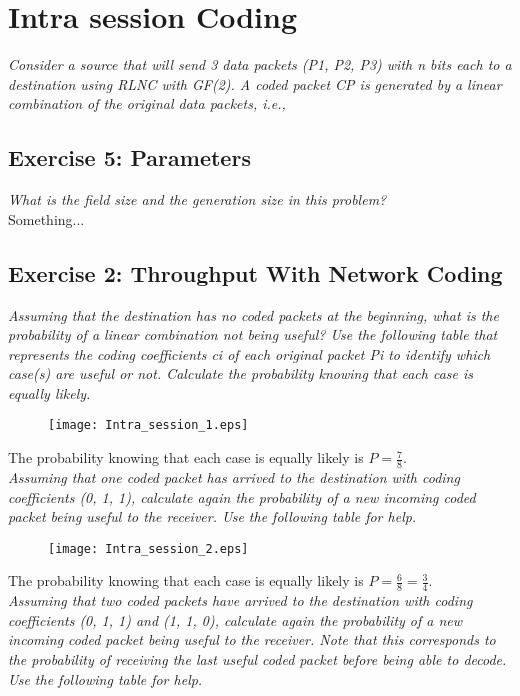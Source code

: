 \section{Intra session Coding}
\textit{Consider a source that will send 3 data packets (P1, P2, P3) with n bits each to a destination using RLNC with GF(2). A coded packet CP is generated by a linear combination of the original data packets, i.e.,}

\subsection{Exercise 5: Parameters }
\textit{What is the field size and the generation size in this problem?}\\

Something...

\subsection{Exercise 2: Throughput With Network Coding}
\textit{Assuming that the destination has no coded packets at the beginning, what is the probability of a linear combination not being useful? Use the following table that represents the coding coefficients ci of each original packet Pi to identify which case(s) are useful or not. Calculate the probability knowing that each case is equally likely.}\\

\begin{figure}[!h]
  \centering
  \texttt{[image: Intra\_session\_1.eps]}
  \caption{}
  \label{fig:Intra_session_1}
\end{figure}
The probability knowing that each case is equally likely is $P=\frac{7}{8}$.\\

\textit{Assuming that one coded packet has arrived to the destination with coding coefficients (0, 1, 1), calculate again the probability of a new incoming coded packet being useful to the receiver. Use the following table for help.}\\

\begin{figure}[!h]
  \centering
  \texttt{[image: Intra\_session\_2.eps]}
  \caption{}
  \label{fig:Intra_session_2}
\end{figure}
The probability knowing that each case is equally likely is $P=\frac{6}{8}=\frac{3}{4}$.\\
\textit{Assuming that two coded packets have arrived to the destination with coding coefficients (0, 1, 1) and (1, 1, 0), calculate again the probability of a new incoming coded packet being useful to the receiver. Note that this corresponds to the probability of receiving the last useful coded packet before being able to decode. Use the following table for help.}\\

